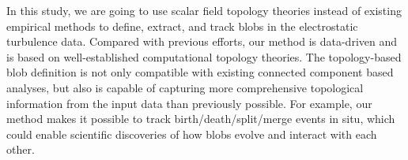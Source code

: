 In this study, we are going to use scalar field topology theories instead of existing empirical methods to define, extract, and track blobs in the electrostatic turbulence data.  Compared with previous efforts, our method is data-driven and is based on well-established computational topology theories.  The topology-based blob definition is not only compatible with existing connected component based analyses, but also is capable of capturing more comprehensive topological information from the input data than previously possible.  For example, our method makes it possible to track birth/death/split/merge events in situ, which could enable scientific discoveries of how blobs evolve and interact with each other.  




